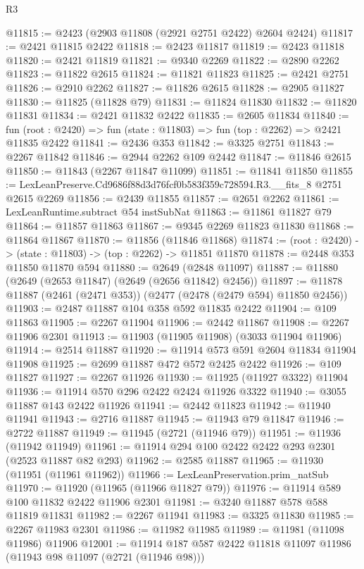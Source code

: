 \begin{lexlean}{R3}
\begin{coremodule}
@11815 := @2423 (@2903 @11808 (@2921 @2751 @2422) @2604 @2424)
@11817 := @2421 @11815 @2422
@11818 := @2423 @11817
@11819 := @2423 @11818
@11820 := @2421 @11819
@11821 := @9340 @2269
@11822 := @2890 @2262
@11823 := @11822 @2615
@11824 := @11821 @11823
@11825 := @2421 @2751
@11826 := @2910 @2262
@11827 := @11826 @2615
@11828 := @2905 @11827
@11830 := @11825 (@11828 @79)
@11831 := @11824 @11830
@11832 := @11820 @11831
@11834 := @2421 @11832 @2422
@11835 := @2605 @11834
@11840 := fun (root : @2420) => fun (state : @11803) => fun (top : @2262) => @2421 @11835 @2422
@11841 := @2436 @353
@11842 := @3325 @2751
@11843 := @2267 @11842
@11846 := @2944 @2262 @109 @2442
@11847 := @11846 @2615
@11850 := @11843 (@2267 @11847 @11099)
@11851 := @11841 @11850
@11855 := LexLeanPreserve.Cd9686f88d3d76fcf0b583f359c728594.R3.__fits_8 @2751 @2615 @2269
@11856 := @2439 @11855
@11857 := @2651 @2262
@11861 := LexLeanRuntime.subtract @54 instSubNat
@11863 := @11861 @11827 @79
@11864 := @11857 @11863
@11867 := @9345 @2269 @11823 @11830
@11868 := @11864 @11867
@11870 := @11856 (@11846 @11868)
@11874 := (root : @2420) -> (state : @11803) -> (top : @2262) -> @11851 @11870
@11878 := @2448 @353 @11850 @11870 @594
@11880 := @2649 (@2848 @11097)
@11887 := @11880 (@2649 (@2653 @11847) (@2649 (@2656 @11842) @2456))
@11897 := @11878 @11887 (@2461 (@2471 @353)) (@2477 (@2478 (@2479 @594) @11850 @2456))
@11903 := @2487 @11887 @104 @358 @592 @11835 @2422
@11904 := @109 @11863
@11905 := @2267 @11904
@11906 := @2442 @11867
@11908 := @2267 @11906 @2301
@11913 := @11903 (@11905 @11908) (@3033 @11904 @11906)
@11914 := @2514 @11887
@11920 := @11914 @573 @591 @2604 @11834 @11904 @11908
@11925 := @2699 @11887 @472 @572 @2425 @2422
@11926 := @109 @11827
@11927 := @2267 @11926
@11930 := @11925 (@11927 @3322) @11904
@11936 := @11914 @570 @296 @2422 @2424 @11926 @3322
@11940 := @3055 @11887 @143 @2422 @11926
@11941 := @2442 @11823
@11942 := @11940 @11941
@11943 := @2716 @11887
@11945 := @11943 @79 @11847
@11946 := @2722 @11887
@11949 := @11945 (@2721 (@11946 @79))
@11951 := @11936 (@11942 @11949)
@11961 := @11914 @294 @100 @2422 @2422 @293 @2301 (@2523 @11887 @82 @293)
@11962 := @2585 @11887
@11965 := @11930 (@11951 (@11961 @11962))
@11966 := LexLeanPreservation.prim_natSub
@11970 := @11920 (@11965 (@11966 @11827 @79))
@11976 := @11914 @589 @100 @11832 @2422 @11906 @2301
@11981 := @3240 @11887 @578 @588 @11819 @11831
@11982 := @2267 @11941
@11983 := @3325 @11830
@11985 := @2267 @11983 @2301
@11986 := @11982 @11985
@11989 := @11981 (@11098 @11986) @11906
@12001 := @11914 @187 @587 @2422 @11818 @11097 @11986 (@11943 @98 @11097 (@2721 (@11946 @98)))

\end{coremodule}
\end{lexlean}
